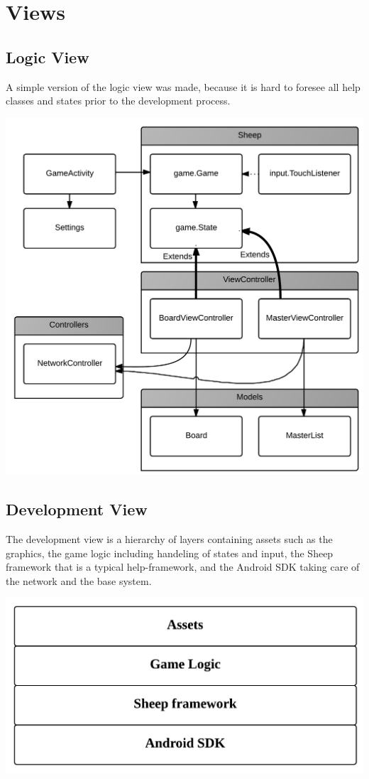 \section{Views} 
\label{sec:views}

\subsection{Logic View}
A simple version of the logic view was made, because it is hard to foresee all
help classes and states prior to the development process. 
\begin{center}
\includegraphics[clip=true, width=0.9 \textwidth]{assets/LogicView.png}
\label{ref:gantt}
\end{center}

\subsection{Development View}
The development view is a hierarchy of layers containing assets such as the
graphics, the game logic including handeling of states and input, the Sheep
framework that is a typical help-framework, and the Android SDK taking care
of the network and the base system.
\begin{center}
\includegraphics[clip=true, width=0.9 \textwidth]{assets/DevelopmentView.png}
\label{ref:gantt}
\end{center}

